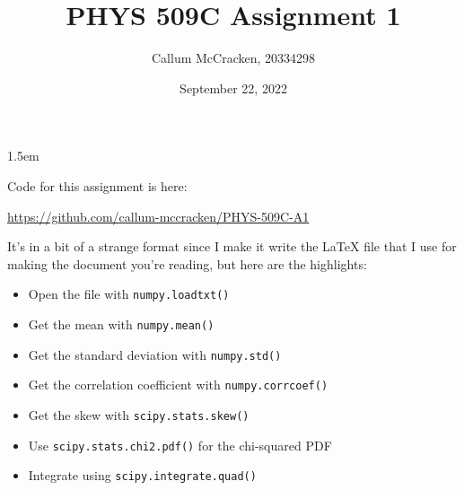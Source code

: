 \documentclass[11pt,letterpaper]{article}
\newcommand{\0}{\mathcal{O}}
\begin{document}
\thispagestyle{fancyplain}
\headheight 35pt
\author{Callum McCracken, 20334298}
\title{PHYS 509C Assignment 1}
\date{September 22, 2022}
\rfoot{\small\thepage}
\headsep 1.5em

\maketitle
\Large{Code for this assignment is here:

\url{https://github.com/callum-mccracken/PHYS-509C-A1}

It's in a bit of a strange format since I make it write the LaTeX file that I use for making the document you're reading, but here are the highlights:

\begin{itemize}
    \item Open the file with \texttt{numpy.loadtxt()}
    \item Get the mean with \texttt{numpy.mean()}
    \item Get the standard deviation with \texttt{numpy.std()}
    \item Get the correlation coefficient with \texttt{numpy.corrcoef()}
    \item Get the skew with \texttt{scipy.stats.skew()}
    \item Use \texttt{scipy.stats.chi2.pdf()} for the chi-squared PDF
    \item Integrate using \texttt{scipy.integrate.quad()}
\end{itemize}
}

\newpage


\newpage

\newpage

\newpage

\end{document}
